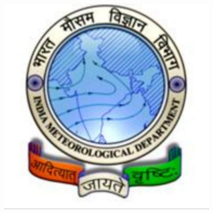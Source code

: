 \documentclass[a4papert,12pt]{report}%
\begin{document}
\thispagestyle{empty}
\begin{center}
 \begin{figure}[htbp]
  \centering
  \includegraphics[scale=0.1]{imd.jpeg}
  \label{image1}
  \end{figure}
\end{center}
\end{document}
